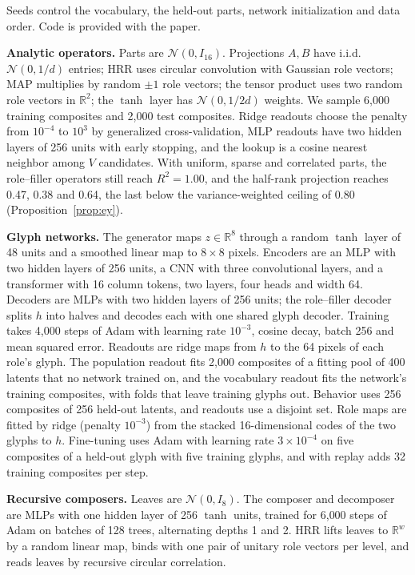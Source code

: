 \documentclass[10pt]{article}
\theoremstyle{plain}
\theoremstyle{remark}
\newcommand{\R}{\mathbb{R}}
\begin{document}
Seeds control the vocabulary, the held-out parts, network initialization and data order. Code is provided with the paper.

\textbf{Analytic operators.} Parts are $\mathcal{N}(0, I_{16})$. Projections $A, B$ have i.i.d.\ $\mathcal{N}(0, 1/d)$ entries; HRR uses circular convolution with Gaussian role vectors; MAP multiplies by random $\pm 1$ role vectors; the tensor product uses two random role vectors in $\R^2$; the $\tanh$ layer has $\mathcal{N}(0, 1/2d)$ weights. We sample 6{,}000 training composites and 2{,}000 test composites. Ridge readouts choose the penalty from $10^{-4}$ to $10^{3}$ by generalized cross-validation, MLP readouts have two hidden layers of 256 units with early stopping, and the lookup is a cosine nearest neighbor among $V$ candidates. With uniform, sparse and correlated parts, the role--filler operators still reach $R^2 = 1.00$, and the half-rank projection reaches 0.47, 0.38 and 0.64, the last below the variance-weighted ceiling of 0.80 (Proposition~\ref{prop:ey}).

\textbf{Glyph networks.} The generator maps $z \in \R^8$ through a random $\tanh$ layer of 48 units and a smoothed linear map to $8 \times 8$ pixels. Encoders are an MLP with two hidden layers of 256 units, a CNN with three convolutional layers, and a transformer with 16 column tokens, two layers, four heads and width 64. Decoders are MLPs with two hidden layers of 256 units; the role--filler decoder splits $h$ into halves and decodes each with one shared glyph decoder. Training takes 4{,}000 steps of Adam with learning rate $10^{-3}$, cosine decay, batch 256 and mean squared error. Readouts are ridge maps from $h$ to the 64 pixels of each role's glyph. The population readout fits 2{,}000 composites of a fitting pool of 400 latents that no network trained on, and the vocabulary readout fits the network's training composites, with folds that leave training glyphs out. Behavior uses 256 composites of 256 held-out latents, and readouts use a disjoint set. Role maps are fitted by ridge (penalty $10^{-3}$) from the stacked 16-dimensional codes of the two glyphs to $h$. Fine-tuning uses Adam with learning rate $3 \times 10^{-4}$ on five composites of a held-out glyph with five training glyphs, and with replay adds 32 training composites per step.

\textbf{Recursive composers.} Leaves are $\mathcal{N}(0, I_8)$. The composer and decomposer are MLPs with one hidden layer of 256 $\tanh$ units, trained for 6{,}000 steps of Adam on batches of 128 trees, alternating depths 1 and 2. HRR lifts leaves to $\R^w$ by a random linear map, binds with one pair of unitary role vectors per level, and reads leaves by recursive circular correlation.
\end{document}

